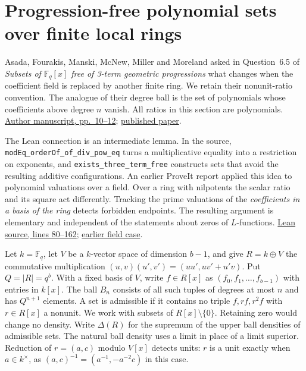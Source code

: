 \section{Progression-free polynomial sets over finite local rings}
\label{sec:finite-rings}

Asada, Fourakis, Manski, McNew, Miller and Moreland asked in Question~6.5 of
\emph{Subsets of $\mathbb F_q[x]$ free of 3-term geometric progressions}
what changes when the coefficient field is replaced by another finite ring.
We retain their nonunit-ratio convention. The analogue of their degree
ball is the set of polynomials whose coefficients above degree $n$ vanish.
All ratios in this section are polynomials.
\href{https://www.nathanmcnew.com/fqxramsey.pdf}{Author manuscript, pp.~10--12};
\href{https://doi.org/10.1016/j.ffa.2016.10.002}{published paper}.

The Lean connection is an intermediate lemma. In the source,
\texttt{modEq\_orderOf\_of\_div\_pow\_eq} turns a multiplicative equality
into a restriction on exponents, and \texttt{exists\_three\_term\_free}
constructs sets that avoid the resulting additive configurations. An
earlier ProveIt report applied this idea to polynomial valuations over a
field. Over a ring with nilpotents the scalar ratio and its square
act differently. Tracking the prime valuations of the \emph{coefficients
in a basis of the ring} detects forbidden endpoints. The resulting
argument is elementary and independent of the statements about zeros
of $L$-functions.
\href{https://github.com/lsernau/grh-lean/blob/72fead102f663d5c7a407964a13dc0cf9d977207/grh/src/New/Reduction/Data/Existence.lean#L80-L162}{Lean source, lines 80--162};
\href{https://github.com/VladimirReshetnikov/ProveIt/blob/d31039a48d963692e5a5176f47b6603fc9e9d9cf/docs/incoming/grh-progression-densities-and-cubic-prime-race.zip}{earlier field case}.

Let $k=\mathbb F_q$, let $V$ be a $k$-vector space of dimension $b-1$,
and give $R=k\oplus V$ the commutative multiplication
$(u,v)(u',v')=(uu',uv'+u'v)$. Put $Q=|R|=q^b$.
With a fixed basis of $V$, write $f\in R[x]$ as
$(f_0,f_1,\ldots,f_{b-1})$ with entries in $k[x]$.
The ball $B_n$ consists of all such tuples of degrees at most $n$ and has
$Q^{n+1}$ elements. A set is admissible if it contains no triple
$f,rf,r^2f$ with $r\in R[x]$ a nonunit. We work with subsets of
$R[x]\setminus\{0\}$. Retaining zero would change no density.
Write $\Delta(R)$ for the supremum of the upper ball densities of
admissible sets. The natural ball density uses a limit in place of a
limit superior. Reduction of $r=(a,c)$ modulo $V[x]$ detects units:
$r$ is a unit exactly when $a\in k^\times$, as
$(a,c)^{-1}=(a^{-1},-a^{-2}c)$ in this case.

